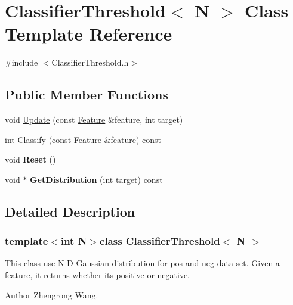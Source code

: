\hypertarget{classClassifierThreshold}{}\section{Classifier\+Threshold$<$ N $>$ Class Template Reference}
\label{classClassifierThreshold}


{\ttfamily \#include $<$Classifier\+Threshold.\+h$>$}

\subsection*{Public Member Functions}
\begin{DoxyCompactItemize}
\item 
void \hyperlink{classClassifierThreshold_ae9bae753884c08a274b2204af8e97340}{Update} (const \hyperlink{classFeature}{Feature} \&feature, int target)
\item 
int \hyperlink{classClassifierThreshold_a1151b0d98ef528494a75718514b73a38}{Classify} (const \hyperlink{classFeature}{Feature} \&feature) const 
\item 
\hypertarget{classClassifierThreshold_a1f566cc491d863b15828561cbdfcd7a0}{}void {\bfseries Reset} ()\label{classClassifierThreshold_a1f566cc491d863b15828561cbdfcd7a0}

\item 
\hypertarget{classClassifierThreshold_ac5ea1576c2b8f51dc2643c7f6dbe7724}{}void $\ast$ {\bfseries Get\+Distribution} (int target) const \label{classClassifierThreshold_ac5ea1576c2b8f51dc2643c7f6dbe7724}

\end{DoxyCompactItemize}


\subsection{Detailed Description}
\subsubsection*{template$<$int N$>$class Classifier\+Threshold$<$ N $>$}

This class use N-\/\+D Gaussian distribution for pos and neg data set. Given a feature, it returns whether it\textquotesingle{}s positive or negative. \begin{DoxyAuthor}{Author}
Zhengrong Wang. 
\end{DoxyAuthor}


